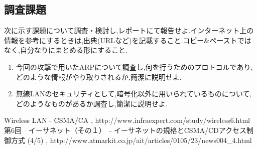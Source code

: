 \documentclass[a4j]{celb-report}
\begin{document}
\subsection{調査課題}
次に示す課題について調査・検討し,レポートにて報告せよ.インターネット上の情報を参考にするときは,出典(URLなど)を記載すること.コピー\&ペーストではなく,自分なりにまとめる形にすること.
\begin{enumerate}
 \renewcommand{\labelenumi}{(\arabic{enumi})}
 \item 今回の攻撃で用いたARPについて調査し,何を行うためのプロトコルであり,どのような情報がやり取りされるか,簡潔に説明せよ.
 \item 無線LANのセキュリティとして,暗号化以外に用いられているものについて,どのようなものがあるか調査し,簡潔に説明せよ.
\end{enumerate}
\newpage
\begin{thebibliography}{9}
 Wireless LAN - CSMA/CA , http://www.infraexpert.com/study/wireless6.html
 第6回　イーサネット（その１）　- イーサネットの規格とCSMA/CDアクセス制御方式 (4/5) , http://www.atmarkit.co.jp/ait/articles/0105/23/news004\_4.html
\end{thebibliography}
%
\end{document}
